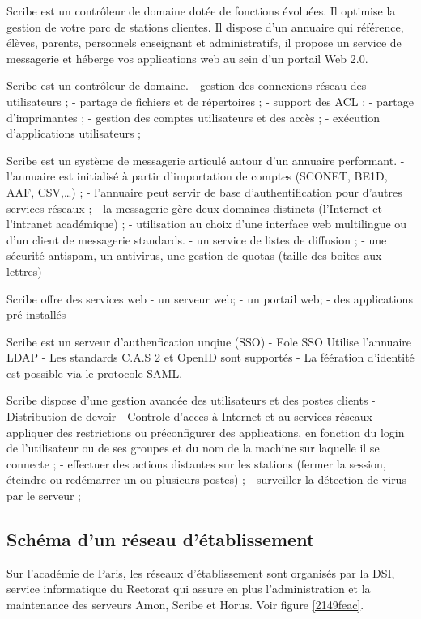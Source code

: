 \documentclass{article}
\begin{document}
Scribe est un contrôleur de domaine dotée de fonctions évoluées. Il
optimise la gestion de votre parc de stations clientes. Il dispose d'un
annuaire qui référence, élèves, parents, personnels enseignant et
administratifs, il propose un service de messagerie et héberge vos
applications web au sein d'un portail Web 2.0.

Scribe est un contrôleur de domaine. - gestion des connexions réseau des
utilisateurs ; - partage de fichiers et de répertoires ; - support des
ACL ; - partage d'imprimantes ; - gestion des comptes utilisateurs et
des accès ; - exécution d'applications utilisateurs ;

Scribe est un système de messagerie articulé autour d'un annuaire
performant. - l'annuaire est initialisé à partir d'importation de
comptes (SCONET, BE1D, AAF, CSV,\ldots{}) ; - l'annuaire peut servir de
base d'authentification pour d'autres services réseaux ; - la messagerie
gère deux domaines distincts (l'Internet et l'intranet académique) ; -
utilisation au choix d'une interface web multilingue ou d'un client de
messagerie standards. - un service de listes de diffusion ; - une
sécurité anti­spam, un anti­virus, une gestion de quotas (taille des
boites aux lettres)

Scribe offre des services web - un serveur web; - un portail web; - des
applications pré-installés

Scribe est un serveur d'authenfication unqiue (SSO) - Eole SSO Utilise
l'annuaire LDAP - Les standards C.A.S 2 et OpenID sont supportés - La
féération d'identité est possible via le protocole SAML.

Scribe dispose d'une gestion avancée des utilisateurs et des postes
clients - Distribution de devoir - Controle d'acces à Internet et au
services réseaux - appliquer des restrictions ou pré­configurer des
applications, en fonction du login de l'utilisateur ou de ses groupes et
du nom de la machine sur laquelle il se connecte ; - effectuer des
actions distantes sur les stations (fermer la session, éteindre ou
redémarrer un ou plusieurs postes) ; - surveiller la détection de virus
par le serveur ;

\subsection{Schéma d'un réseau d'établissement}

Sur l'académie de Paris, les réseaux d'établissement sont organisés par
la DSI, service informatique du Rectorat qui assure en plus
l'administration et la maintenance des serveurs Amon, Scribe et Horus.
Voir figure \ref{2149feac}.
\end{document}
